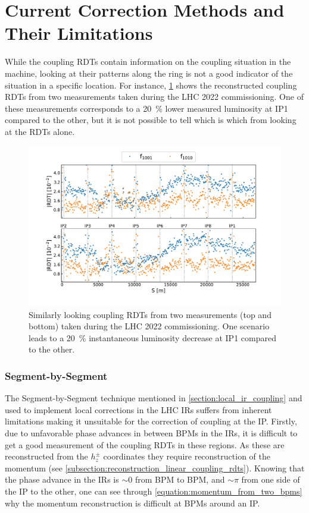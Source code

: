 \section{Current Correction Methods and Their Limitations}
\label{section:current_correction_methods_and_their_limitations}

While the coupling RDTs contain information on the coupling situation in the machine, looking at their patterns along the ring is not a good indicator of the situation in a specific location.
For instance, \cref{figure:guess_rdts} shows the reconstructed coupling RDTs from two measurements taken during the LHC \num{2022} commissioning.
One of these measurements corresponds to a \qty{20}{\percent} lower measured luminosity at IP\num{1} compared to the other, but it is not possible to tell which is which from looking at the RDTs alone.

\begin{figure}
    \centering
    \includegraphics*[width=0.99\linewidth]{Figures/IR_Coupling_Correction/similar_rdts_different_ip1_lumi.pdf}
    \caption{Similarly looking coupling RDTs from two measurements (top and bottom) taken during the LHC \num{2022} commissioning. One scenario leads to a \qty{20}{\percent} instantaneous luminosity decrease at IP\num{1} compared to the other.}
    \label{figure:guess_rdts}
\end{figure}

\subsubsection*{Segment-by-Segment}

The Segment-by-Segment technique mentioned in \cref{section:local_ir_coupling} and used to implement local corrections in the LHC IRs suffers from inherent limitations making it unsuitable for the correction of coupling at the IP.
Firstly, due to unfavorable phase advances in between BPMs in the IRs, it is difficult to get a good measurement of the coupling RDTs in these regions.
As these are reconstructed from the \(h_z^\pm\) coordinates they require reconstruction of the momentum (see \cref{subsection:reconstruction_linear_coupling_rdts}).
Knowing that the phase advance in the IRs is \(\sim 0\) from BPM to BPM, and \(\sim \pi\) from one side of the IP to the other, one can see through \cref{equation:momentum_from_two_bpms} why the momentum reconstruction is difficult at BPMs around an IP.

